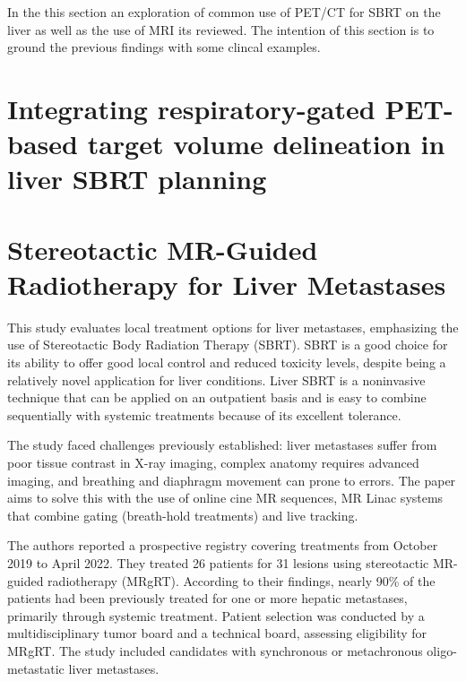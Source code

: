 
\label{sec:case2}


In the this section an exploration of common use of PET/CT for SBRT on the liver as well as the use of MRI its reviewed. The intention of this section is to ground the previous findings with some clincal examples.

\section*{Integrating respiratory-gated PET-based target volume delineation in liver SBRT planning}



\section*{Stereotactic MR-Guided Radiotherapy for Liver Metastases}

This study evaluates local treatment options for liver metastases, emphasizing the use of Stereotactic Body Radiation Therapy (SBRT). SBRT is a good choice for its ability to offer good local control and reduced toxicity levels, despite being a relatively novel application for liver conditions. Liver SBRT is a noninvasive technique that can be applied on an outpatient basis and is easy to combine sequentially with systemic treatments because of its excellent tolerance.

The study faced challenges previously established: liver metastases suffer from poor tissue contrast in X-ray imaging, complex anatomy requires advanced imaging, and breathing and diaphragm movement can prone to errors. The paper aims to solve this with the use of online cine MR sequences, MR Linac systems that combine gating (breath-hold treatments) and live tracking.

The authors reported a prospective registry covering treatments from October 2019 to April 2022. They treated 26 patients for 31 lesions using stereotactic MR-guided radiotherapy (MRgRT). According to their findings, nearly 90\% of the patients had been previously treated for one or more hepatic metastases, primarily through systemic treatment. Patient selection was conducted by a multidisciplinary tumor board and a technical board, assessing eligibility for MRgRT. The study included candidates with synchronous or metachronous oligo-metastatic liver metastases.

